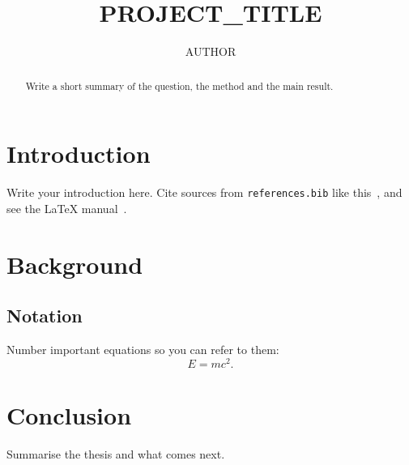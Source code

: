 \documentclass[12pt]{ut-thesis}
\author{{{AUTHOR}}}
\title{{{PROJECT_TITLE}}}
\begin{document}
\frontmatter
\maketitle

\begin{abstract}
Write a short summary of the question, the method and the main result.
\end{abstract}

\tableofcontents

\mainmatter
\chapter{Introduction}
Write your introduction here. Cite sources from \texttt{references.bib} like
this~\cite{einstein1905}, and see the \LaTeX{} manual~\cite{lamport1994}.

\chapter{Background}
\section{Notation}
Number important equations so you can refer to them:
\begin{equation}
  E = mc^2 . \label{eq:energy}
\end{equation}

\chapter{Conclusion}
Summarise the thesis and what comes next.



\end{document}
